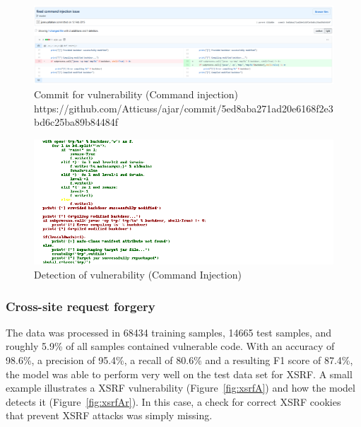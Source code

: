 \documentclass[
a4paper,
pagesize,
pdftex,
12pt,
twoside, %
BCOR=5mm, %
ngerman,
fleqn,
final,
]{scrartcl}
\begin{document}
	\begin{figure}[H]
		\centering
		\includegraphics[width=\linewidth]{Images/command_injectionB}
		\caption{Commit for vulnerability (Command injection) \newline \scriptsize{https://github.com/Atticuss/ajar/commit/5ed8aba271ad20e6168f2e3bd6c25ba89b84484f}}
		\label{fig:command_injectionB}
	\end{figure}
	\begin{figure}[H]
		\centering
		\includegraphics[width=\linewidth]{Images/command_injectionBr}
		\caption{Detection of vulnerability (Command Injection)}
		\label{fig:command_injectionBr}
	\end{figure}
	
	
	\subsubsection{Cross-site request forgery}
	The data was processed in 68434 training samples, 14665 test samples, and roughly 5.9\% of all samples contained vulnerable code. With an accuracy of 98.6\%, a precision of 95.4\%, a recall of 80.6\% and a resulting F1 score of 87.4\%, the model was able to perform very well on the test data set for XSRF. A small example illustrates a XSRF vulnerability (Figure~\ref{fig:xsrfA}) and how the model detects it (Figure~\ref{fig:xsrfAr}). In this case, a check for correct XSRF cookies that prevent XSRF attacks was simply missing.
	
\end{document}
